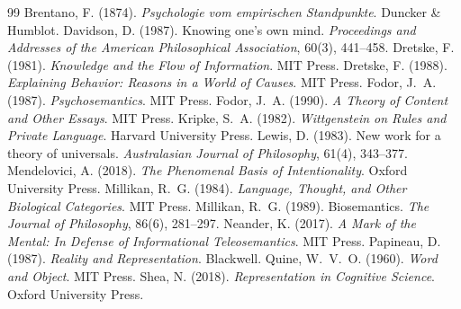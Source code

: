 \documentclass{situationist-preprint}
\begin{document}
\begin{thebibliography}{99}\small
{} Brentano, F. (1874). \emph{Psychologie vom empirischen Standpunkte}. Duncker \& Humblot.
 Davidson, D. (1987). Knowing one's own mind. \emph{Proceedings and Addresses of the American Philosophical Association}, 60(3), 441--458.
 Dretske, F. (1981). \emph{Knowledge and the Flow of Information}. MIT Press.
 Dretske, F. (1988). \emph{Explaining Behavior: Reasons in a World of Causes}. MIT Press.
 Fodor, J.~A. (1987). \emph{Psychosemantics}. MIT Press.
 Fodor, J.~A. (1990). \emph{A Theory of Content and Other Essays}. MIT Press.
 Kripke, S.~A. (1982). \emph{Wittgenstein on Rules and Private Language}. Harvard University Press.
 Lewis, D. (1983). New work for a theory of universals. \emph{Australasian Journal of Philosophy}, 61(4), 343--377.
 Mendelovici, A. (2018). \emph{The Phenomenal Basis of Intentionality}. Oxford University Press.
 Millikan, R.~G. (1984). \emph{Language, Thought, and Other Biological Categories}. MIT Press.
 Millikan, R.~G. (1989). Biosemantics. \emph{The Journal of Philosophy}, 86(6), 281--297.
 Neander, K. (2017). \emph{A Mark of the Mental: In Defense of Informational Teleosemantics}. MIT Press.
 Papineau, D. (1987). \emph{Reality and Representation}. Blackwell.
 Quine, W.~V.~O. (1960). \emph{Word and Object}. MIT Press.
 Shea, N. (2018). \emph{Representation in Cognitive Science}. Oxford University Press.
\end{thebibliography}
\end{document}
